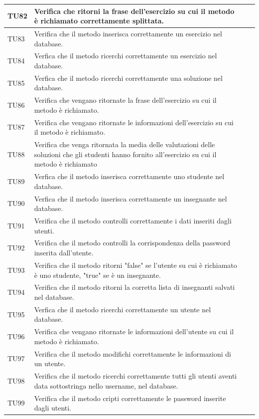 \begin{longtable}{|>{\centering\arraybackslash}m{1.6cm}|>{\centering\arraybackslash}m{6.41cm}|>{\centering\arraybackslash}m{3.1cm}| c |}
		TU82 & Verifica che ritorni la frase dell'esercizio su cui il metodo è richiamato correttamente splittata.  \\ \hline
		TU83 & Verifica che il metodo inserisca correttamente un esercizio nel database.  \\ \hline
		TU84 & Verfica che il metodo ricerchi correttamente un esercizio nel database.  \\ \hline
		TU85 & Verfica che il metodo ricerchi correttamente una soluzione nel database.  \\ \hline
		TU86 & Verifica che vengano ritornate la frase dell'esercizio su cui il metodo è richiamato.  \\ \hline
		TU87 & Verifica che vengano ritornate le informazioni dell'esercizio su cui il metodo è richiamato.  \\ \hline
		TU88 & Verifica che venga ritornata la media delle valutazioni delle soluzioni che gli studenti hanno fornito all'esercizio su cui il metodo è richiamato  \\ \hline
		TU89 & Verfica che il metodo inserisca correttamente uno studente nel database.  \\ \hline
		TU90 & Verfica che il metodo inserisca correttamente un insegnante nel database.  \\ \hline
		TU91 & Verifica che il metodo controlli correttamente i dati inseriti dagli utenti.  \\ \hline
		TU92 & Verifica che il metodo controlli la corrispondenza della password inserita dall'utente.  \\ \hline
		TU93 & Verifica che il metodo ritorni "false" se l'utente su cui è richiamato è uno studente, "true" se è un insegnante.  \\ \hline
		TU94 & Verifica che il metodo ritorni la corretta lista di insegnanti salvati nel database.  \\ \hline
		TU95 & Verfica che il metodo ricerchi correttamente un utente nel database.  \\ \hline
		TU96 & Verifica che vengano ritornate le informazioni dell'utente su cui il metodo è richiamato.   \\ \hline
		TU97 & Verifica che il metodo modifichi correttamente le informazioni di un utente.  \\ \hline
		TU98 & Verifica che il metodo ricerchi correttamente tutti gli utenti aventi data sottostringa nello username, nel database.  \\ \hline
		TU99 & Verifica che il metodo cripti correttamente le password inserite dagli utenti.  \\ \hline

\end{longtable}
